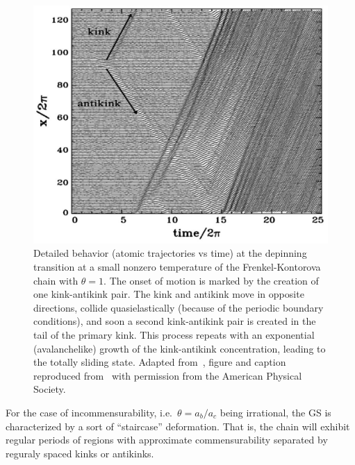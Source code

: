 \begin{figure}[!htb]
  \centering
  \includegraphics[width=0.45\linewidth]{figures/theory/kink_antikink.png}
  \caption{Detailed behavior (atomic trajectories vs time) at the depinning transition at a small nonzero temperature of the Frenkel-Kontorova chain with $\theta = 1$. The onset of motion is marked by the creation of one kink-antikink pair. The kink and antikink move in opposite directions, collide quasielastically (because of the periodic boundary conditions), and soon a second kink-antikink pair is created in the tail of the primary kink. This process repeats with an exponential (avalanchelike) growth of the kink-antikink concentration, leading to the totally sliding state. Adapted from~\cite{PhysRevLett.79.3692}, figure and caption reproduced from~\cite{Vanossi_2013} with permission from the American Physical Society.}
  \label{fig:kink_antikink}
\end{figure}






For the case of incommensurability, i.e.\ $\theta = a_b/a_c$ being irrational,
the \acrshort{GS} is characterized by a sort of ``staircase''  deformation. That
is, the chain will exhibit regular periods of regions with approximate
commensurability separated by reguraly spaced kinks or antikinks. 


